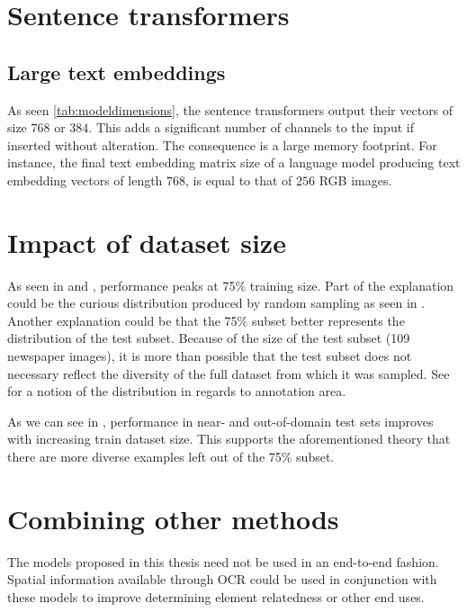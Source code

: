 \documentclass[oneside, english, bibtex]{kththesis}
\begin{document}
\section{Sentence transformers}

\subsection{Large text embeddings} 

As seen \autoref{tab:modeldimensions}, the sentence transformers output their vectors of size $768$ or $384$. This adds a significant number of channels to the input if inserted without alteration. The consequence is a large memory footprint. For instance, the final text embedding matrix size of a language model producing text embedding vectors of length $768$, is equal to that of $256$ RGB images.  

\section{Impact of dataset size}

As seen in  and , performance peaks at 75\% training size. Part of the explanation could be the curious distribution produced by random sampling as seen in . Another explanation could be that the 75\% subset better represents the distribution of the test subset. Because of the size of the test subset (109 newspaper images), it is more than possible that the test subset does not necessary reflect the diversity of the full dataset from which it was sampled. See  for a notion of the distribution in regards to annotation area.

As we can see in , performance in near- and out-of-domain test sets improves with increasing train dataset size. This supports the aforementioned theory that there are more diverse examples left out of the 75\% subset.

\section{Combining other methods}

The models proposed in this thesis need not be used in an end-to-end fashion. Spatial information available through OCR could be used in conjunction with these models to improve determining element relatedness or other end uses. 
\end{document}
